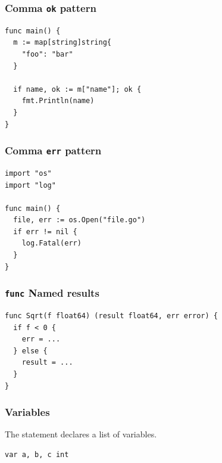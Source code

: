 \documentclass[xetex,mathserif,serif,12pt]{beamer}
\begin{document}
\begin{frame}[fragile]
  \frametitle{Comma \texttt{ok} pattern}

  \begin{beamer@nomargin}
    \begin{lstlisting}
func main() {
  m := map[string]string{
    "foo": "bar"
  }

  if name, ok := m["name"]; ok {
    fmt.Println(name)  
  }
}
    \end{lstlisting}
  \end{beamer@nomargin}
\end{frame}

\begin{frame}[fragile]
  \frametitle{Comma \texttt{err} pattern}

  \begin{beamer@nomargin}
    \begin{lstlisting}
import "os"
import "log"

func main() {
  file, err := os.Open("file.go")
  if err != nil {
    log.Fatal(err)
  }
}
    \end{lstlisting}
  \end{beamer@nomargin}
\end{frame}


\begin{frame}[fragile]
  \frametitle{\texttt{func} Named results}

  \begin{beamer@nomargin}
    \begin{lstlisting}
func Sqrt(f float64) (result float64, err error) {
  if f < 0 {
    err = ...
  } else {
    result = ...
  }
}
    \end{lstlisting}
  \end{beamer@nomargin}
\end{frame}

\begin{frame}[fragile]
  \frametitle{Variables}

  The  statement declares a list of variables.
  \newline

  \begin{beamer@nomargin}
    \begin{lstlisting}
var a, b, c int
    \end{lstlisting}
  \end{beamer@nomargin}
\end{frame}
\end{document}
